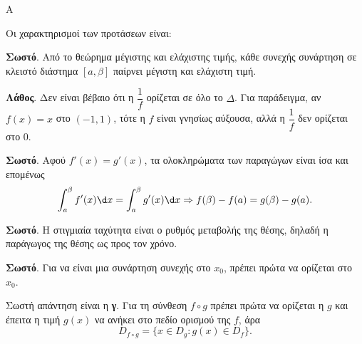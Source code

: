 \begin{thema}{Α}
\begin{erwthma}
\item {}

\item {}

\item {}

\item Οι χαρακτηρισμοί των προτάσεων είναι:
\begin{alist}
\item \textbf{Σωστό}. Από το θεώρημα μέγιστης και ελάχιστης τιμής, κάθε συνεχής συνάρτηση σε κλειστό διάστημα $[a,\beta]$ παίρνει μέγιστη και ελάχιστη τιμή.
\item \textbf{Λάθος}. Δεν είναι βέβαιο ότι η $\dfrac{1}{f}$ ορίζεται σε όλο το $\Delta$. Για παράδειγμα, αν $f(x)=x$ στο $(-1,1)$, τότε η $f$ είναι γνησίως αύξουσα, αλλά η $\dfrac{1}{f}$ δεν ορίζεται στο $0$.
\item \textbf{Σωστό}. Αφού $f'(x)=g'(x)$, τα ολοκληρώματα των παραγώγων είναι ίσα και επομένως
\[ \dint_a^\beta f'(x)\d x=\dint_a^\beta g'(x)\d x
\Rightarrow f(\beta)-f(a)=g(\beta)-g(a). \]
\item \textbf{Σωστό}. Η στιγμιαία ταχύτητα είναι ο ρυθμός μεταβολής της θέσης, δηλαδή η παράγωγος της θέσης ως προς τον χρόνο.
\item \textbf{Σωστό}. Για να είναι μια συνάρτηση συνεχής στο $x_0$, πρέπει πρώτα να ορίζεται στο $x_0$.
\end{alist}

\item Σωστή απάντηση είναι η \textbf{γ}. Για τη σύνθεση $f\circ g$ πρέπει πρώτα να ορίζεται η $g$ και έπειτα η τιμή $g(x)$ να ανήκει στο πεδίο ορισμού της $f$, άρα
\[ D_{f\circ g}=\{x\in D_g:g(x)\in D_f\}. \]
\end{erwthma}
\end{thema}

